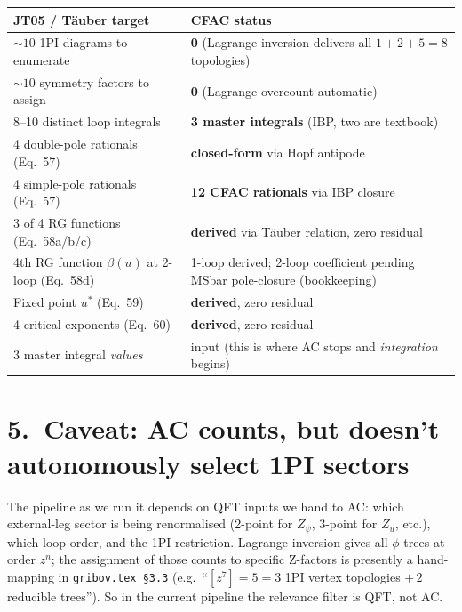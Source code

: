 \documentclass[11pt,a4paper]{article}
\begin{document}
\begin{center}
\begin{tabular}{@{}p{6.5cm}p{8.5cm}@{}}
\toprule
JT05 / T\"auber target & CFAC status \\
\midrule
$\sim 10$ 1PI diagrams to enumerate         & \textbf{0} (Lagrange inversion delivers all $1+2+5 = 8$ topologies) \\
$\sim 10$ symmetry factors to assign        & \textbf{0} (Lagrange overcount automatic) \\
8--10 distinct loop integrals               & \textbf{3 master integrals} (IBP, two are textbook) \\
4 double-pole rationals (Eq.~57)            & \textbf{closed-form} via Hopf antipode \\
4 simple-pole rationals (Eq.~57)            & \textbf{12 CFAC rationals} via IBP closure \\
3 of 4 RG functions (Eq.~58a/b/c)           & \textbf{derived} via T\"auber relation, zero residual \\
4th RG function $\beta(u)$ at 2-loop (Eq.~58d) & 1-loop derived; 2-loop coefficient pending MSbar pole-closure (bookkeeping) \\
Fixed point $u^*$ (Eq.~59)                  & \textbf{derived}, zero residual \\
4 critical exponents (Eq.~60)               & \textbf{derived}, zero residual \\
3 master integral \emph{values}             & input (this is where AC stops and \emph{integration} begins) \\
\bottomrule
\end{tabular}
\end{center}

\section*{5.\ Caveat: AC counts, but doesn't autonomously select 1PI sectors}

The pipeline as we run it depends on QFT inputs we hand to AC: which external-leg sector is being renormalised (2-point for $Z_\psi$, 3-point for $Z_u$, etc.), which loop order, and the 1PI restriction. Lagrange inversion gives all $\phi$-trees at order $z^n$; the assignment of those counts to specific Z-factors is presently a hand-mapping in \texttt{gribov.tex \S 3.3} (e.g.\ ``$[z^7] = 5 = 3$ 1PI vertex topologies $+\,2$ reducible trees''). So in the current pipeline the relevance filter is QFT, not AC.
\end{document}
